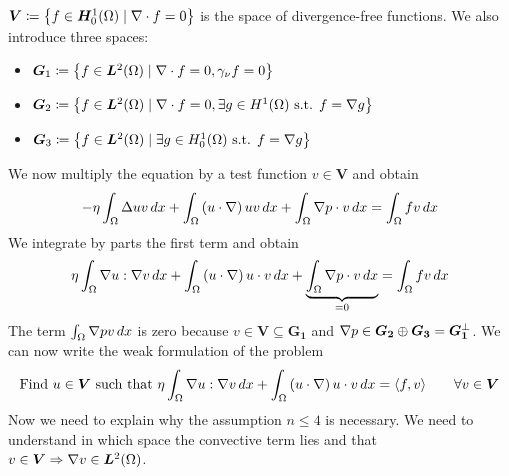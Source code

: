 \begin{remark}
    \(\bm{V} \coloneqq \left\{ f \in \bm{H}^1_0(\Omega) \mid \nabla \cdot f = 0 \right\}\) is the space of divergence-free functions.
    We also introduce three spaces:
    \begin{itemize}
        \item \(\bm{G}_1 \coloneqq \left\{ f \in \bm{L}^2(\Omega) \mid \nabla \cdot f = 0, \gamma_\nu f = 0 \right\}\)
        \item \(\bm{G}_2 \coloneqq \left\{ f \in \bm{L}^2(\Omega) \mid \nabla \cdot f = 0, \exists g \in H^1(\Omega) \text{ s.t. } f = \nabla g \right\}\)
        \item \(\bm{G}_3 \coloneqq \left\{ f \in \bm{L}^2(\Omega) \mid \exists g \in H^1_0(\Omega) \text{ s.t. } f = \nabla g \right\}\)
    \end{itemize}
\end{remark}
We now multiply the equation by a test function \(v \in \bm{V}\) and obtain
\[
    \begin{split}
        - \eta \int_\Omega \Delta u v \, dx + \int_\Omega \left( u \cdot \nabla \right) u v \, dx + \int_\Omega \nabla p \cdot v \, dx = \int_\Omega f v \, dx
    \end{split}
\]
We integrate by parts the first term and obtain
\[
    \begin{split}
        \eta \int_\Omega \nabla u : \nabla v \, dx + \int_\Omega \left( u \cdot \nabla \right) u \cdot v \, dx + \underbrace{\int_\Omega \nabla p \cdot v \, dx}_{=0} = \int_\Omega f v \, dx
    \end{split}
\]
The term \(\int_\Omega \nabla p v \, dx\) is zero because \(v \in \bm{V}
\subseteq \bm{G_1}\) and \(\nabla p \in \bm{G_2} \oplus \bm{G_3} =
\bm{G_1}^\perp\). We can now write the weak formulation of the problem
\[
    \begin{split}
        \text{Find } u \in \bm{V} \text{ such that } \eta \int_\Omega \nabla u : \nabla v \, dx + \int_\Omega \left( u \cdot \nabla \right) u \cdot v \, dx = \langle f, v \rangle \qquad \forall v \in \bm{V}
    \end{split}
\]
Now we need to explain why the assumption \(n \leq 4\) is necessary. We need to
understand in which space the convective term lies and that \(v \in \bm{V}
\Rightarrow \nabla v \in \bm{L}^2(\Omega)\).
